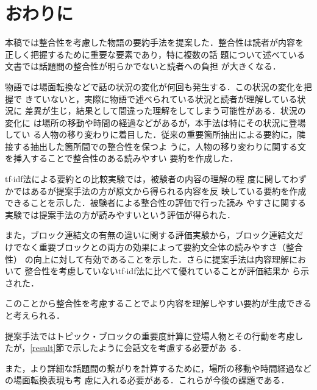 \documentclass[japanese]{jnlp_1.4}
\begin{document}
 \section{おわりに}

 本稿では整合性を考慮した物語の要約手法を提案した．整合性は読者が内容を
 正しく把握するために重要な要素であり，特に複数の話
 題について述べている文書では話題間の整合性が明らかでないと読者への負担
 が大きくなる．

 物語では場面転換などで話の状況の変化が何回も発生する．この状況の変化を把握で
 きていないと，実際に物語で述べられている状況と読者が理解している状況に
 差異が生じ，結果として間違った理解をしてしまう可能性がある．状況の変化に
 は場所の移動や時間の経過などがあるが，本手法は特にその状況に登場してい
 る人物の移り変わりに着目した．従来の重要箇所抽出による要約に，隣接する抽出した箇所間での整合性を保つよ
 うに，人物の移り変わりに関する文を挿入することで整合性のある読みやすい
 要約を作成した．

 tf$\cdot$idf法による要約との比較実験では，被験者の内容の理解の程
 度に関してわずかではあるが提案手法の方が原文から得られる内容を反
 映している要約を作成できることを示した．被験者による整合性の評価で行った読み
 やすさに関する実験では提案手法の方が読みやすいという評価が得られた．

 また，ブロック連結文の有無の違いに関する評価実験から，ブロック連結文だ
 けでなく重要ブロックとの両方の効果によって要約文全体の読みやすさ（整合性）
 の向上に対して有効であることを示した．さらに提案手法は内容理解において
 整合性を考慮していないtf$\cdot$idf法に比べて優れていることが評価結果か
 ら示された．

このことから整合性を考慮することでより内容を理解しやすい要約が生成できる
 と考えられる．

 

 提案手法ではトピック・ブロックの重要度計算に登場人物とその行動を考慮し
 たが，\ref{result}節で示したように会話文を考慮する必要があ
 る．
 
 
 また，より詳細な話題間の繋がりを計算するために，場所の移動や時間経過などの場面転換表現も考
 慮に入れる必要がある．これらが今後の課題である．
\end{document}
